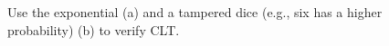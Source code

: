 \documentclass[11pt, letterpaper]{article}
\begin{document}
\begin{figure}[!t]
    \centering
    \hfil
    \caption{Use the exponential (a) and a tampered dice (e.g., six has a higher probability) (b) to verify CLT.}
    \label{fig:clt mc}
\end{figure}



\end{document}
